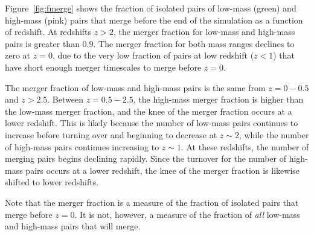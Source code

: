 \documentclass[twocolumn,linenumbers]{aastex631}
\begin{document}
Figure~\ref{fig:fmerge} shows the fraction of isolated pairs of low-mass (green) and high-mass (pink) pairs that merge before the end of the simulation as a function of redshift. 
At redshifts $z>2$, the merger fraction for low-mass and high-mass pairs is greater than $0.9$.
The merger fraction for both mass ranges declines to zero at $z=0$, due to the very low fraction of pairs at low redshift ($z<1$) that have short enough merger timescales to merge before $z=0$.

The merger fraction of low-mass and high-mass pairs is the same from $z=0-0.5$ and $z>2.5$. 
Between $z=0.5-2.5$, the high-mass merger fraction is higher than the low-mass merger fraction, and the knee of the merger fraction occurs at a lower redshift.
This is likely because the number of low-mass pairs continues to increase before turning over and beginning to decrease at $z\sim2$, while the number of high-mass pairs continues increasing to $z\sim1$. 
At these redshifts, the number of merging pairs begins declining rapidly. 
Since the turnover for the number of high-mass pairs occurs at a lower redshift, the knee of the merger fraction is likewise shifted to lower redshifts.

Note that the merger fraction is a measure of the fraction of isolated pairs that merge before $z=0$. It is not, however, a measure of the fraction of \textit{all} low-mass and high-mass pairs that will merge. 
\end{document}
